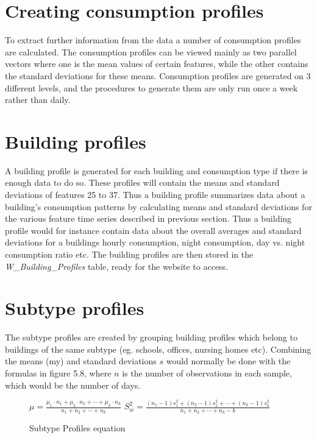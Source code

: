 \section{Creating consumption profiles}
To extract further information from the data a number of consumption profiles are calculated. The consumption profiles can be viewed mainly as two parallel vectors where one is the mean values of certain features, while the other contains the standard deviations for these means. Consumption profiles are generated on 3 different levels, and the procedures to generate them are only run once a week rather than daily. 
\section*{Building profiles}
A building profile is generated for each building and consumption type if there is enough data to do so. These profiles will contain the means and standard deviations of features 25 to 37. Thus a building profile summarizes data about a building's consumption patterns by calculating means and standard deviations for the various feature time series described in previous section. Thus a building profile would for instance contain data about the overall averages and standard deviations for a buildings hourly consumption, night consumption, day vs. night consumption ratio etc. The building profiles are then stored in the \emph{W\_Building\_Profiles} table, ready for the website to access.
\section*{Subtype profiles}
The subtype profiles are created by grouping building profiles which belong to buildings of the same subtype (eg. schools, offices, nursing homes etc). Combining the means (my) and standard deviations $s$ would normally be done with the formulas in figure 5.8, where $n$ is the number of observations in each sample, which would be the number of days.
\begin{figure}
\begin{center}
$\mu = \frac{\mu_1\cdot n_1+\mu_2\cdot n_2+ \cdots +\mu_k\cdot n_k}{n_1+n_2+ \cdots +n_k}$
\newline
\newline
$S_w^2 = \frac{(n_1-1)s_1^2+(n_2-1)s_2^2+\cdots +(n_k - 1)s_k^2}{n_1 + n_2+\cdots +n_k -k}$
\end{center}
\caption{Subtype Profiles equation}
\end{figure}


